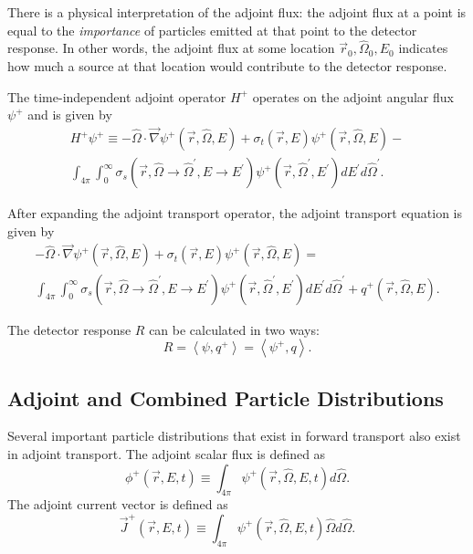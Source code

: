 There is a physical interpretation of the adjoint flux: the adjoint flux at a point is equal to the \textit{importance} of particles emitted at that point to the detector response.
In other words, the adjoint flux at some location $\vec{r}_0, \hat{\Omega}_0, E_0$ indicates how much a source at that location would contribute to the detector response.

The time-independent adjoint operator $H^+$ operates on the adjoint angular flux $\psi^+$ and is given by
\begin{multline}\label{eq:bg:rt:transport-operator}
  H^+\psi^+ \equiv
  -\hat{\Omega}\cdot\vec{\nabla}\psi^+\left(\vec{r},\hat{\Omega},E\right) +
  \sigma_t\left(\vec{r},E\right)\psi^+\left(\vec{r},\hat{\Omega},E\right) - \\
  \int_{4\pi}\int_0^\infty\sigma_s\left(\vec{r},\hat{\Omega}\rightarrow\hat{\Omega}^\prime,E\rightarrow E^\prime\right)\psi^+\left(\vec{r},\hat{\Omega}^\prime,E^\prime\right)dE^\prime d\hat{\Omega}^\prime.
\end{multline}

After expanding the adjoint transport operator, the adjoint transport equation is given by
\begin{multline}\label{eq:bg:rt:adjoint-transport}
  -\hat{\Omega}\cdot\vec{\nabla}\psi^+\left(\vec{r},\hat{\Omega},E\right) +
  \sigma_t\left(\vec{r},E\right)\psi^+\left(\vec{r},\hat{\Omega},E\right) = \\
  \int_{4\pi}\int_0^\infty\sigma_s\left(\vec{r},\hat{\Omega}\rightarrow\hat{\Omega}^\prime,E\rightarrow E^\prime\right)\psi^+\left(\vec{r},\hat{\Omega}^\prime,E^\prime\right)dE^\prime d\hat{\Omega}^\prime +
  q^+\left(\vec{r},\hat{\Omega},E\right).
\end{multline}

The detector response $R$ can be calculated in two ways:
\begin{equation}\label{eq:bg:rt:detector-response}
  R = \left<\psi,q^+\right>
    = \left<\psi^+,q\right>.
\end{equation}

\subsection{Adjoint and Combined Particle Distributions}
\label{sec:bg:rt:at:apd}

Several important particle distributions that exist in forward transport also exist in adjoint transport.
The adjoint scalar flux is defined as
\begin{equation}\label{eq:bg:rt:scalar-flux}
  \phi^+\left(\vec{r},E,t\right) \equiv
  \int_{4\pi}\psi^+\left(\vec{r},\hat{\Omega},E,t\right)d\hat{\Omega}.
\end{equation}
The adjoint current vector is defined as
\begin{equation}\label{eq:bg:rt:current-vector}
  \vec{J}^+\left(\vec{r},E,t\right) \equiv
  \int_{4\pi}\psi^+\left(\vec{r},\hat{\Omega},E,t\right)\hat{\Omega} d\hat{\Omega}.
\end{equation}

